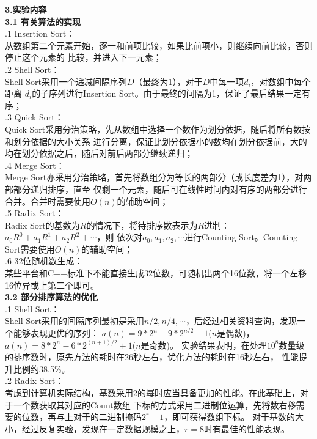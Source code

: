 \documentclass[a4paper]{article}
\begin{document}
\begin{enumerate}
  \textbf{3.实验内容}\\
  \textbf{3.1 有关算法的实现}\\
  .1 Insertion Sort：\\
  从数组第二个元素开始，逐一和前项比较，如果比前项小，则继续向前比较，否则停止这个元素的
  比较，并进入下一元素；\\
  .2 Shell Sort：\\
  Shell Sort采用一个递减间隔序列$D$（最终为1），对于$D$中每一项$d_i$，对数组中每个距离
  $d_i$的子序列进行Insertion Sort。由于最终的间隔为1，保证了最后结果一定有序；\\
  .3 Quick Sort：\\
  Quick Sort采用分治策略，先从数组中选择一个数作为划分依据，随后将所有数按和划分依据的大小关系
  进行分离，保证比划分依据小的数均在划分依据前，大的均在划分依据之后，随后对前后两部分继续递归；\\
  .4 Merge Sort：\\
  Merge Sort亦采用分治策略，首先将数组分为等长的两部分（或长度差为1），对两部部分递归排序，直至
  仅剩一个元素，随后可在线性时间内对有序的两部分进行合并。合并时需要使用$O(n)$的辅助空间；\\
  .5 Radix Sort：\\
  Radix Sort的基数为$R$的情况下，将待排序数表示为$R$进制：$a_0R^0+a_1R^1+a_2R^2+\cdots$，则
  依次对$a_0,a_1,a_2,\cdots$进行Counting Sort。Counting Sort需要使用$O(n)$的辅助空间；\\
  .6 32位随机数生成：\\
  某些平台和C++标准下不能直接生成32位数，可随机出两个16位数，将一个左移16位异或上第二个即可。\\
  \medskip
  \textbf{3.2 部分排序算法的优化}\\
  .1 Shell Sort：\\
  Shell Sort采用的间隔序列最初是采用$n/2,n/4,\cdots$，后经过相关资料查询，发现一个能够表现更优的序列：
  $a(n) = 9*2^n - 9*2^{n/2} + 1$($n$是偶数)，$a(n) = 8*2^n - 6*2^{(n+1)/2} + 1$($n$是奇数)。
  实验结果表明，在处理$10^8$数量级的排序数时，原先方法的耗时在26秒左右，优化方法的耗时在16秒左右，
  性能提升比例约38.5\%。\\
  .2 Radix Sort：\\
  考虑到计算机实际结构，基数采用2的幂时应当具备更加的性能。在此基础上，对于一个数获取其对应的Count数组
  下标的方式采用二进制位运算，先将数右移需要的位数，再与上对于的二进制掩码$2^r-1$，即可获得数组下标。
  对于基数的大小，经过反复实验，发现在一定数据规模之上，$r=8$时有最佳的性能表现。\\

\end{enumerate}
\end{document}
